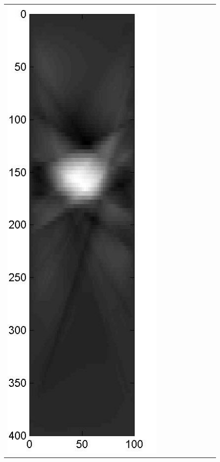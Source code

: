 \documentclass[english]{siamltex}
\begin{document}
{\begin{figure}[!h]
\begin{center}
\begin{tabular}{|c|c|c|c|c|c|c|c|c|}
			\includegraphics[width=.9\iwidth]{figures/newFigs/noisy/resultsExp-3-mk}
			&

\end{tabular}
\end{center}
\end{figure}}
\end{document}

